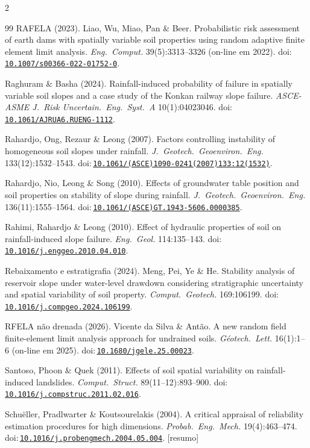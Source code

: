\documentclass[11pt,a4paper]{article}
\newcommand{\doi}[1]{doi:\,\href{https://doi.org/#1}{\nolinkurl{#1}}}
\begin{document}
\begin{multicols}{2}
\begin{thebibliography}{99}
 RAFELA (2023). Liao, Wu, Miao, Pan \& Beer. Probabilistic risk assessment of earth
dams with spatially variable soil properties using random adaptive finite element limit analysis. \emph{Eng.\ Comput.}
39(5):3313--3326 (on-line em 2022). \doi{10.1007/s00366-022-01752-0}.

 Raghuram \& Basha (2024). Rainfall-induced probability of failure in
spatially variable soil slopes and a case study of the Konkan railway slope failure. \emph{ASCE-ASME J.\ Risk
Uncertain.\ Eng.\ Syst.\ A} 10(1):04023046. \doi{10.1061/AJRUA6.RUENG-1112}.

 Rahardjo, Ong, Rezaur \& Leong (2007). Factors controlling instability of
homogeneous soil slopes under rainfall. \emph{J.\ Geotech.\ Geoenviron.\ Eng.} 133(12):1532--1543.
\doi{10.1061/(ASCE)1090-0241(2007)133:12(1532)}.

 Rahardjo, Nio, Leong \& Song (2010). Effects of groundwater table position
and soil properties on stability of slope during rainfall. \emph{J.\ Geotech.\ Geoenviron.\ Eng.} 136(11):1555--1564.
\doi{10.1061/(ASCE)GT.1943-5606.0000385}.

 Rahimi, Rahardjo \& Leong (2010). Effect of hydraulic properties of soil on
rainfall-induced slope failure. \emph{Eng.\ Geol.} 114:135--143. \doi{10.1016/j.enggeo.2010.04.010}.

 Rebaixamento e estratigrafia (2024). Meng, Pei, Ye
\& He. Stability analysis of reservoir slope under water-level drawdown considering stratigraphic uncertainty and
spatial variability of soil property. \emph{Comput.\ Geotech.} 169:106199. \doi{10.1016/j.compgeo.2024.106199}.

 RFELA não drenada (2026). Vicente da Silva \& Antão. A new random field
finite-element limit analysis approach for undrained soils. \emph{Géotech.\ Lett.} 16(1):1--6 (on-line em 2025).
\doi{10.1680/jgele.25.00023}.

 Santoso, Phoon \& Quek (2011). Effects of soil spatial variability on
rainfall-induced landslides. \emph{Comput.\ Struct.} 89(11--12):893--900. \doi{10.1016/j.compstruc.2011.02.016}.

 Schuëller, Pradlwarter \& Koutsourelakis (2004). A critical appraisal of
reliability estimation procedures for high dimensions. \emph{Probab.\ Eng.\ Mech.} 19(4):463--474.
\doi{10.1016/j.probengmech.2004.05.004}. [resumo]


\end{thebibliography}
\end{multicols}
\end{document}

